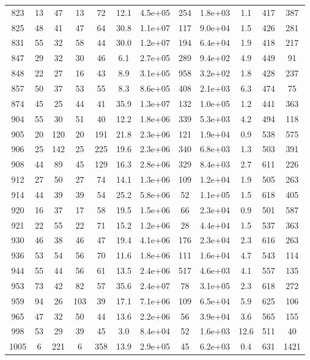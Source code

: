 \begin{table}
\begin{tabular}{cccccccccccc}
823 & 13 & 47 & 13 & 72 & 12.1 & 4.5e+05 & 254 & 1.8e+03 & 1.1 & 417 & 387 \\
825 & 48 & 41 & 47 & 64 & 30.8 & 1.1e+07 & 117 & 9.0e+04 & 1.5 & 426 & 281 \\
831 & 55 & 32 & 58 & 44 & 30.0 & 1.2e+07 & 194 & 6.4e+04 & 1.9 & 418 & 217 \\
847 & 29 & 32 & 30 & 46 & 6.1 & 2.7e+05 & 289 & 9.4e+02 & 4.9 & 449 & 91 \\
848 & 22 & 27 & 16 & 43 & 8.9 & 3.1e+05 & 958 & 3.2e+02 & 1.8 & 428 & 237 \\
857 & 50 & 37 & 53 & 55 & 8.3 & 8.6e+05 & 408 & 2.1e+03 & 6.3 & 474 & 75 \\
874 & 45 & 25 & 44 & 41 & 35.9 & 1.3e+07 & 132 & 1.0e+05 & 1.2 & 441 & 363 \\
904 & 55 & 30 & 51 & 40 & 12.2 & 1.8e+06 & 339 & 5.3e+03 & 4.2 & 494 & 118 \\
905 & 20 & 120 & 20 & 191 & 21.8 & 2.3e+06 & 121 & 1.9e+04 & 0.9 & 538 & 575 \\
906 & 25 & 142 & 25 & 225 & 19.6 & 2.3e+06 & 340 & 6.8e+03 & 1.3 & 503 & 391 \\
908 & 44 & 89 & 45 & 129 & 16.3 & 2.8e+06 & 329 & 8.4e+03 & 2.7 & 611 & 226 \\
912 & 27 & 50 & 27 & 74 & 14.1 & 1.3e+06 & 109 & 1.2e+04 & 1.9 & 505 & 263 \\
914 & 44 & 39 & 39 & 54 & 25.2 & 5.8e+06 & 52 & 1.1e+05 & 1.5 & 618 & 405 \\
920 & 16 & 37 & 17 & 58 & 19.5 & 1.5e+06 & 66 & 2.3e+04 & 0.9 & 501 & 587 \\
921 & 22 & 55 & 22 & 71 & 15.2 & 1.2e+06 & 28 & 4.4e+04 & 1.5 & 537 & 363 \\
930 & 46 & 38 & 46 & 47 & 19.4 & 4.1e+06 & 176 & 2.3e+04 & 2.3 & 616 & 263 \\
936 & 53 & 54 & 56 & 70 & 11.6 & 1.8e+06 & 111 & 1.6e+04 & 4.7 & 543 & 114 \\
944 & 55 & 44 & 56 & 61 & 13.5 & 2.4e+06 & 517 & 4.6e+03 & 4.1 & 557 & 135 \\
953 & 73 & 42 & 82 & 57 & 35.6 & 2.4e+07 & 78 & 3.1e+05 & 2.3 & 618 & 272 \\
959 & 94 & 26 & 103 & 39 & 17.1 & 7.1e+06 & 109 & 6.5e+04 & 5.9 & 625 & 106 \\
965 & 47 & 32 & 50 & 44 & 13.6 & 2.2e+06 & 56 & 3.9e+04 & 3.6 & 565 & 155 \\
998 & 53 & 29 & 39 & 45 & 3.0 & 8.4e+04 & 52 & 1.6e+03 & 12.6 & 511 & 40 \\
1005 & 6 & 221 & 6 & 358 & 13.9 & 2.9e+05 & 45 & 6.2e+03 & 0.4 & 631 & 1421 \\

\end{tabular}
\end{table}
